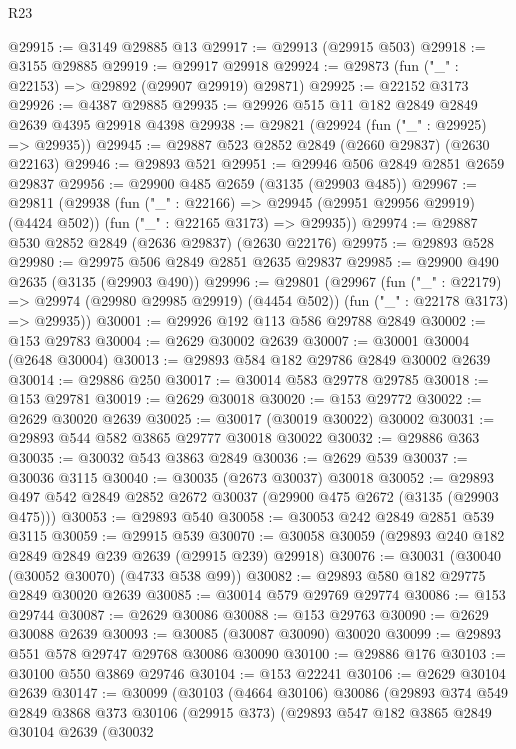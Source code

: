 \begin{lexlean}{R23}
\begin{coremodule}
@29915 := @3149 @29885 @13
@29917 := @29913 (@29915 @503)
@29918 := @3155 @29885
@29919 := @29917 @29918
@29924 := @29873 (fun ("_" : @22153) => @29892 (@29907 @29919) @29871)
@29925 := @22152 @3173
@29926 := @4387 @29885
@29935 := @29926 @515 @11 @182 @2849 @2849 @2639 @4395 @29918 @4398
@29938 := @29821 (@29924 (fun ("_" : @29925) => @29935))
@29945 := @29887 @523 @2852 @2849 (@2660 @29837) (@2630 @22163)
@29946 := @29893 @521
@29951 := @29946 @506 @2849 @2851 @2659 @29837
@29956 := @29900 @485 @2659 (@3135 (@29903 @485))
@29967 := @29811
    (@29938
      (fun ("_" : @22166) => @29945 (@29951 @29956 @29919) (@4424 @502))
      (fun ("_" : @22165 @3173) => @29935))
@29974 := @29887 @530 @2852 @2849 (@2636 @29837) (@2630 @22176)
@29975 := @29893 @528
@29980 := @29975 @506 @2849 @2851 @2635 @29837
@29985 := @29900 @490 @2635 (@3135 (@29903 @490))
@29996 := @29801
    (@29967
      (fun ("_" : @22179) => @29974 (@29980 @29985 @29919) (@4454 @502))
      (fun ("_" : @22178 @3173) => @29935))
@30001 := @29926 @192 @113 @586 @29788 @2849
@30002 := @153 @29783
@30004 := @2629 @30002 @2639
@30007 := @30001 @30004 (@2648 @30004)
@30013 := @29893 @584 @182 @29786 @2849 @30002 @2639
@30014 := @29886 @250
@30017 := @30014 @583 @29778 @29785
@30018 := @153 @29781
@30019 := @2629 @30018
@30020 := @153 @29772
@30022 := @2629 @30020 @2639
@30025 := @30017 (@30019 @30022) @30002
@30031 := @29893 @544 @582 @3865 @29777 @30018 @30022
@30032 := @29886 @363
@30035 := @30032 @543 @3863 @2849
@30036 := @2629 @539
@30037 := @30036 @3115
@30040 := @30035 (@2673 @30037) @30018
@30052 := @29893 @497 @542 @2849 @2852 @2672 @30037 (@29900 @475 @2672 (@3135 (@29903 @475)))
@30053 := @29893 @540
@30058 := @30053 @242 @2849 @2851 @539 @3115
@30059 := @29915 @539
@30070 := @30058 @30059 (@29893 @240 @182 @2849 @2849 @239 @2639 (@29915 @239) @29918)
@30076 := @30031 (@30040 (@30052 @30070) (@4733 @538 @99))
@30082 := @29893 @580 @182 @29775 @2849 @30020 @2639
@30085 := @30014 @579 @29769 @29774
@30086 := @153 @29744
@30087 := @2629 @30086
@30088 := @153 @29763
@30090 := @2629 @30088 @2639
@30093 := @30085 (@30087 @30090) @30020
@30099 := @29893 @551 @578 @29747 @29768 @30086 @30090
@30100 := @29886 @176
@30103 := @30100 @550 @3869 @29746
@30104 := @153 @22241
@30106 := @2629 @30104 @2639
@30147 := @30099
    (@30103
      (@4664 @30106)
      @30086
      (@29893
        @374
        @549
        @2849
        @3868
        @373
        @30106
        (@29915 @373)
        (@29893
          @547
          @182
          @3865
          @2849
          @30104
          @2639
          (@30032

\end{coremodule}
\end{lexlean}
